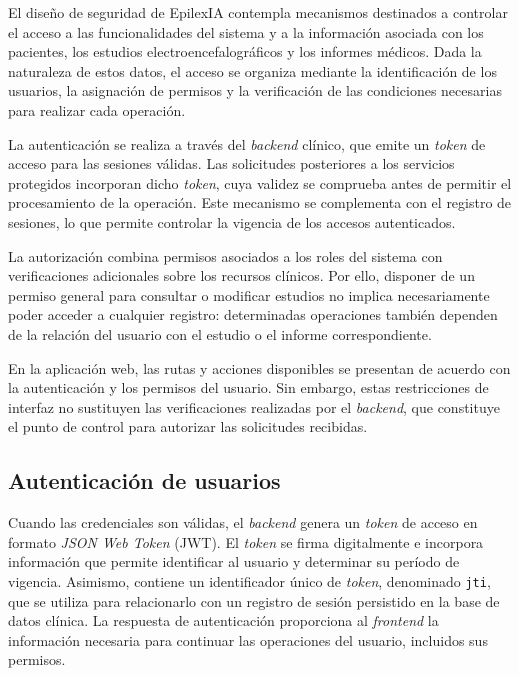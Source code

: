 El diseño de seguridad de EpilexIA contempla mecanismos destinados a controlar el acceso a las funcionalidades del sistema y a la información asociada con los pacientes, los estudios electroencefalográficos y los informes médicos. Dada la naturaleza de estos datos, el acceso se organiza mediante la identificación de los usuarios, la asignación de permisos y la verificación de las condiciones necesarias para realizar cada operación.

La autenticación se realiza a través del \textit{backend} clínico, que emite un \textit{token} de acceso para las sesiones válidas. Las solicitudes posteriores a los servicios protegidos incorporan dicho \textit{token}, cuya validez se comprueba antes de permitir el procesamiento de la operación. Este mecanismo se complementa con el registro de sesiones, lo que permite controlar la vigencia de los accesos autenticados.

La autorización combina permisos asociados a los roles del sistema con verificaciones adicionales sobre los recursos clínicos. Por ello, disponer de un permiso general para consultar o modificar estudios no implica necesariamente poder acceder a cualquier registro: determinadas operaciones también dependen de la relación del usuario con el estudio o el informe correspondiente.

En la aplicación web, las rutas y acciones disponibles se presentan de acuerdo con la autenticación y los permisos del usuario. Sin embargo, estas restricciones de interfaz no sustituyen las verificaciones realizadas por el \textit{backend}, que constituye el punto de control para autorizar las solicitudes recibidas.

\subsection{Autenticación de usuarios}
\label{subsec:autenticacion-usuarios}

Cuando las credenciales son válidas, el \textit{backend} genera un \textit{token} de acceso en formato \textit{JSON Web Token} (JWT).
 El \textit{token} se firma digitalmente e incorpora información que permite identificar al usuario y determinar su período de vigencia. Asimismo, contiene un identificador único de \textit{token}, denominado \texttt{jti}, que se utiliza para relacionarlo con un registro de sesión persistido en la base de datos clínica. La respuesta de autenticación proporciona al \textit{frontend} la información necesaria para continuar las operaciones del usuario, incluidos sus permisos.

